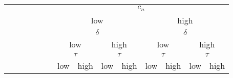 \documentclass[a4paper,10pt]{article}
\begin{document}
    \begin{table}[htp]
        \begin{center}
        \begin{small}
        \begin{tabular}{cccccc|cccccccc}
           &&&&&& \multicolumn{8}{c}{$c_n$} \\
        &&&&&& \multicolumn{4}{c}{low}&\multicolumn{4}{c}{high} \\
           \hline
        &&&&&& \multicolumn{4}{c}{$\delta$}&\multicolumn{4}{c}{$\delta$} \\
        &&&&&& \multicolumn{2}{c}{low}&\multicolumn{2}{c}{high}&\multicolumn{2}{c}{low}&\multicolumn{2}{c}{high} \\
           \hline
        &&&&&& \multicolumn{2}{c}{$\tau$}&\multicolumn{2}{c}{$\tau$}&\multicolumn{2}{c}{$\tau$}&\multicolumn{2}{c}{$\tau$}\\
    &&&&&&low&high&low&high&low&high&low&high\\
    

\end{tabular}
\end{small}
\end{center}
\end{table}
\end{document}
